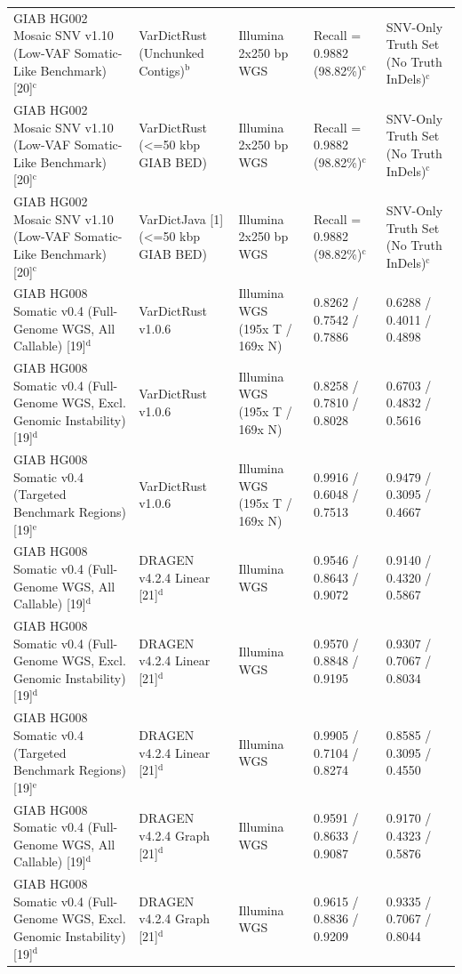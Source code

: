 \begin{table}[htbp]
{\begin{tabular}{lllll}
GIAB HG002 Mosaic SNV v1.10 (Low-VAF Somatic-Like Benchmark) [20]$^{\text{c}}$ & VarDictRust (Unchunked Contigs)$^{\text{b}}$ & Illumina 2x250 bp WGS & Recall = 0.9882 (98.82\%)$^{\text{c}}$ & SNV-Only Truth Set (No Truth InDels)$^{\text{c}}$ \\
GIAB HG002 Mosaic SNV v1.10 (Low-VAF Somatic-Like Benchmark) [20]$^{\text{c}}$ & VarDictRust (\textless{}=50 kbp GIAB BED) & Illumina 2x250 bp WGS & Recall = 0.9882 (98.82\%)$^{\text{c}}$ & SNV-Only Truth Set (No Truth InDels)$^{\text{c}}$ \\
GIAB HG002 Mosaic SNV v1.10 (Low-VAF Somatic-Like Benchmark) [20]$^{\text{c}}$ & VarDictJava [1] (\textless{}=50 kbp GIAB BED) & Illumina 2x250 bp WGS & Recall = 0.9882 (98.82\%)$^{\text{c}}$ & SNV-Only Truth Set (No Truth InDels)$^{\text{c}}$ \\
GIAB HG008 Somatic v0.4 (Full-Genome WGS, All Callable) [19]$^{\text{d}}$ & VarDictRust v1.0.6 & Illumina WGS (195x T / 169x N) & 0.8262 / 0.7542 / 0.7886 & 0.6288 / 0.4011 / 0.4898 \\
GIAB HG008 Somatic v0.4 (Full-Genome WGS, Excl. Genomic Instability) [19]$^{\text{d}}$ & VarDictRust v1.0.6 & Illumina WGS (195x T / 169x N) & 0.8258 / 0.7810 / 0.8028 & 0.6703 / 0.4832 / 0.5616 \\
GIAB HG008 Somatic v0.4 (Targeted Benchmark Regions) [19]$^{\text{e}}$ & VarDictRust v1.0.6 & Illumina WGS (195x T / 169x N) & 0.9916 / 0.6048 / 0.7513 & 0.9479 / 0.3095 / 0.4667 \\
GIAB HG008 Somatic v0.4 (Full-Genome WGS, All Callable) [19]$^{\text{d}}$ & DRAGEN v4.2.4 Linear [21]$^{\text{d}}$ & Illumina WGS & 0.9546 / 0.8643 / 0.9072 & 0.9140 / 0.4320 / 0.5867 \\
GIAB HG008 Somatic v0.4 (Full-Genome WGS, Excl. Genomic Instability) [19]$^{\text{d}}$ & DRAGEN v4.2.4 Linear [21]$^{\text{d}}$ & Illumina WGS & 0.9570 / 0.8848 / 0.9195 & 0.9307 / 0.7067 / 0.8034 \\
GIAB HG008 Somatic v0.4 (Targeted Benchmark Regions) [19]$^{\text{e}}$ & DRAGEN v4.2.4 Linear [21]$^{\text{d}}$ & Illumina WGS & 0.9905 / 0.7104 / 0.8274 & 0.8585 / 0.3095 / 0.4550 \\
GIAB HG008 Somatic v0.4 (Full-Genome WGS, All Callable) [19]$^{\text{d}}$ & DRAGEN v4.2.4 Graph [21]$^{\text{d}}$ & Illumina WGS & 0.9591 / 0.8633 / 0.9087 & 0.9170 / 0.4323 / 0.5876 \\
GIAB HG008 Somatic v0.4 (Full-Genome WGS, Excl. Genomic Instability) [19]$^{\text{d}}$ & DRAGEN v4.2.4 Graph [21]$^{\text{d}}$ & Illumina WGS & 0.9615 / 0.8836 / 0.9209 & 0.9335 / 0.7067 / 0.8044 \\

\end{tabular}}
\end{table}
